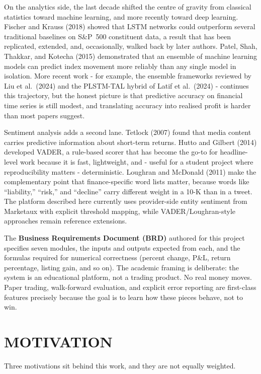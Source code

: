 \documentclass[12pt,a4paper]{report}
\numberwithin{equation}{chapter}
\begin{document}
On the analytics side, the last decade shifted the centre of gravity from classical statistics toward machine learning, and more recently toward deep learning. Fischer and Krauss (2018) showed that LSTM networks could outperform several traditional baselines on S\&P~500 constituent data, a result that has been replicated, extended, and, occasionally, walked back by later authors. Patel, Shah, Thakkar, and Kotecha (2015) demonstrated that an ensemble of machine learning models can predict index movement more reliably than any single model in isolation. More recent work - for example, the ensemble frameworks reviewed by Liu et al.\ (2024) and the PLSTM-TAL hybrid of Latif et al.\ (2024) - continues this trajectory, but the honest picture is that predictive accuracy on financial time series is still modest, and translating accuracy into realised profit is harder than most papers suggest.

Sentiment analysis adds a second lane. Tetlock (2007) found that media content carries predictive information about short-term returns. Hutto and Gilbert (2014) developed VADER, a rule-based scorer that has become the go-to for headline-level work because it is fast, lightweight, and - useful for a student project where reproducibility matters - deterministic. Loughran and McDonald (2011) make the complementary point that finance-specific word lists matter, because words like ``liability,'' ``risk,'' and ``decline'' carry different weight in a 10-K than in a tweet. The platform described here currently uses provider-side entity sentiment from Marketaux with explicit threshold mapping, while VADER/Loughran-style approaches remain reference extensions.

The \textbf{Business Requirements Document (BRD)} authored for this project specifies seven modules, the inputs and outputs expected from each, and the formulas required for numerical correctness (percent change, P\&L, return percentage, listing gain, and so on). The academic framing is deliberate: the system is an educational platform, not a trading product. No real money moves. Paper trading, walk-forward evaluation, and explicit error reporting are first-class features precisely because the goal is to learn how these pieces behave, not to win.

\section{MOTIVATION}

Three motivations sit behind this work, and they are not equally weighted.
\end{document}

